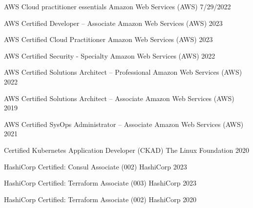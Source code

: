 

\begin{cvhonors}

  \cvhonor
    {AWS Cloud practitioner essentials} %
    {Amazon Web Services (AWS)} %
    {} %
    {7/29/2022} %

  \cvhonor
    {AWS Certified Developer – Associate} %
    {Amazon Web Services (AWS)} %
    {} %
    {2023} %

  \cvhonor
    {AWS Certified Cloud Practitioner} %
    {Amazon Web Services (AWS)} %
    {} %
    {2023} %

  \cvhonor
    {AWS Certified Security - Specialty} %
    {Amazon Web Services (AWS)} %
    {} %
    {2022} %

  \cvhonor
    {AWS Certified Solutions Architect – Professional} %
    {Amazon Web Services (AWS)} %
    {} %
    {2022} %

  \cvhonor
    {AWS Certified Solutions Architect – Associate} %
    {Amazon Web Services (AWS)} %
    {} %
    {2019} %

  \cvhonor
    {AWS Certified SysOps Administrator – Associate} %
    {Amazon Web Services (AWS)} %
    {} %
    {2021} %

  \cvhonor
    {Certified Kubernetes Application Developer (CKAD)} %
    {The Linux Foundation} %
    {} %
    {2020} %

  \cvhonor
    {HashiCorp Certified: Consul Associate (002)} %
    {HashiCorp} %
    {} %
    {2023} %

  \cvhonor
    {HashiCorp Certified: Terraform Associate (003)} %
    {HashiCorp} %
    {} %
    {2023} %

  \cvhonor
    {HashiCorp Certified: Terraform Associate (002)} %
    {HashiCorp} %
    {} %
    {2020} %

\end{cvhonors}
